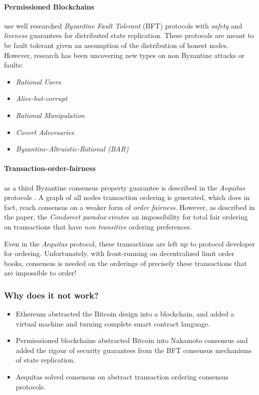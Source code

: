 \documentclass[12pt]{article}
\begin{document}
\paragraph{Permissioned Blockchains} use well researched \emph{Byzantine Fault Tolerant} (BFT) protocols with \emph{safety} and \emph{liveness} guarantees for distributed state replication. \cite{Gueta} These protocols are meant to be fault tolerant given an assumption of the distribution of honest nodes. However, research has been uncovering new types on non Byzantine attacks or faults:      
\begin{center}
\begin{itemize}{}
  \item \emph{Rational Users} \cite{Hou}
  \item \emph{Alive-but-corrupt} \cite{Malkhi}
  \item \emph{Rational Manipulation} \cite{Shneidman}
  \item \emph{Covert Adversaries} \cite{Aumann}
  \item \emph{Byzantine-Altruistic-Rational (BAR)} \cite{Aiyer}
\end{itemize}
\end{center}

\paragraph{Transaction-order-fairness} as a third Byzantine consensus property guarantee is described in the \emph{Aequitas} protocols \cite{Kelkar_2020}. A graph of all nodes transaction ordering is generated, which does in fact, reach consensus on a weaker form of \emph{order fairness}. However, as described in the paper, the \emph{Condorcet paradox} creates an impossibility for total fair ordering on transactions that have \emph{non transitive} ordering preferences. 

Even in the \emph{Aequitas} protocol, these transactions are left up to protocol developer for ordering. Unfortunately, with front-running on decentralized limit order books, consensus is needed on the orderings of precisely these transactions that are impossible to order! 

\subsubsection*{Why does it not work?} 
\begin{itemize}{}
\item Ethereum abstracted the Bitcoin design into a blockchain, and added a virtual machine and turning complete smart contract language. 
\item Permisssioned blockchains abstracted Bitcoin into Nakamoto consensus and added the rigour of security guarantees from the BFT consensus mechanisms of state replication. 
\item Aequitas solved consensus on abstract transaction ordering consensus protocols. 
\end{itemize}
\end{document}
